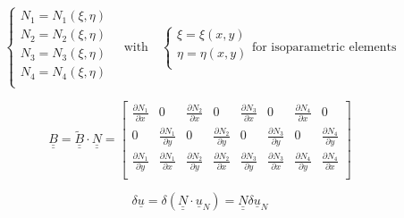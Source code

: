 \documentclass[a4paper]{jpconf}
\begin{document}
\begin{equation}
\begin{cases}
N_{1}=N_{1}\left(\xi,\eta\right)\\
N_{2}=N_{2}\left(\xi,\eta\right)\\
N_{3}=N_{3}\left(\xi,\eta\right)\\
N_{4}=N_{4}\left(\xi,\eta\right)\\
\end{cases}\quad\text{with}\quad\begin{cases}
\xi=\xi\left(x,y\right)\\
\eta=\eta\left(x,y\right)\\
\end{cases}\text{for isoparametric elements}
\end{equation}

\begin{equation}
\underline{\underline{B}}=\underline{\underline{\widetilde{B}}}\cdot\underline{\underline{N}}=\begin{bmatrix}
\frac{\partial N_{1}}{\partial x}&0&\frac{\partial N_{2}}{\partial x}&0&\frac{\partial N_{3}}{\partial x}&0&\frac{\partial N_{4}}{\partial x}&0\\[7.5pt]
0&\frac{\partial N_{1}}{\partial y}&0&\frac{\partial N_{2}}{\partial y}&0&\frac{\partial N_{3}}{\partial y}&0&\frac{\partial N_{4}}{\partial y}\\[7.5pt]
\frac{\partial N_{1}}{\partial y}&\frac{\partial N_{1}}{\partial x}&\frac{\partial N_{2}}{\partial y}&\frac{\partial N_{2}}{\partial x}&\frac{\partial N_{3}}{\partial y}&\frac{\partial N_{3}}{\partial x}&\frac{\partial N_{4}}{\partial y}&\frac{\partial N_{4}}{\partial x}\\
\end{bmatrix}
\end{equation}

\begin{equation}
\delta\underline{u}=\delta\left(\underline{\underline{N}}\cdot\underline{u}_{N}\right)=\underline{\underline{N}}\delta\underline{u}_{N}
\end{equation}
\end{document}
